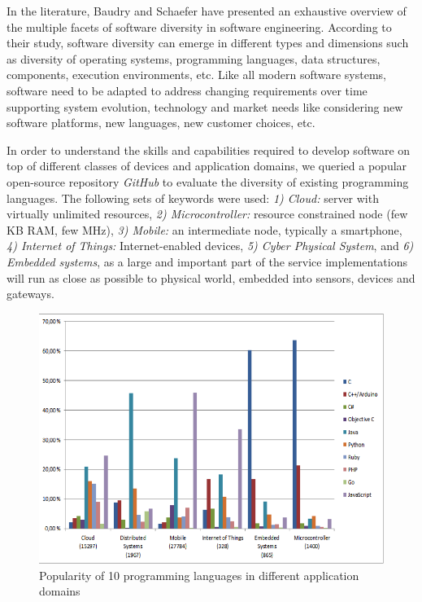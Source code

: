 In the literature, Baudry \etal\cite{baudry2015multiple} and Schaefer \etal\cite{schaefer2012software} have presented an exhaustive overview of the multiple facets of software diversity in software engineering. 
According to their study, software diversity can emerge in different types and dimensions such as diversity of operating systems, programming languages, data structures, components, execution environments, etc. 
Like all modern software systems, software need to be adapted to address changing requirements over time supporting system evolution, technology and market needs like considering new software platforms, new languages, new customer choices, etc.

In order to understand the skills and capabilities required to develop software on top of different classes of devices and application domains, we queried a popular open-source repository \textit{GitHub} to evaluate the diversity of existing programming languages.  
The following sets of keywords were used: \textit{1) Cloud:} server with virtually unlimited resources, \textit{2) Microcontroller:} resource constrained node (few KB RAM, few MHz),  \textit{3) Mobile:} an intermediate node, typically a smartphone,  \textit{4) Internet of Things:} Internet-enabled devices,  \textit{5) Cyber Physical System}, and  \textit{6) Embedded systems}, as a large and important part of the service implementations will run as close as possible to physical world, embedded into sensors, devices and gateways.

\begin{figure}[h]
	\center
	\includegraphics[scale=1.]{Background/fig/github}
	\caption{Popularity of 10 programming languages in different application domains}
	\label{fig:github}
\end{figure}

